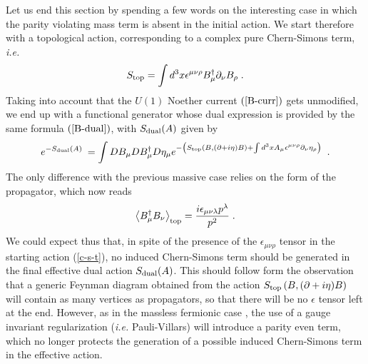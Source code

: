 \documentclass[a4paper,12pt]{article}
\begin{document}
\noindent Let us end this section by spending a few words on the interesting
case in which the parity violating mass term is absent in the initial
action. We start therefore with a topological action, corresponding to
a complex pure Chern-Simons term, {\it i.e.}
\begin{equation}
S_{{\rm top}}=\int d^3x\epsilon ^{\mu \nu \rho }B_\mu ^{\dagger
}\partial _\nu B_\rho \;.
\label{c-s-t}
\end{equation}
Taking into account that the $U(1)$ Noether current $\left( {\rm {\ref
      {B-curr}}}\right) $ gets unmodified, we end up with a functional
generator whose dual expression is provided by the same formula
$\left( {\rm {\ref {B-dual}}}\right) $, with $S_{{\rm dual}}(A)$ given
by
\begin{equation}
e^{-S_{{\rm dual}}(A)\;}=\int DB_\mu DB_\mu ^{\dagger }D\eta _\mu e^{-\left(
S_{{\rm top}}(B,(\partial +i\eta )B)+\int d^3xA_\mu \epsilon ^{\mu \nu
\rho }\partial _\nu \eta _\rho \right) \;}\;.  \label{d-c-s}
\end{equation}
The only difference with the previous massive case relies on the form
of the propagator, which now reads
\begin{equation}
\left\langle B_\mu ^{\dagger }B_\nu \right\rangle _{{\rm top}}=\frac{%
i\epsilon _{\mu \nu \lambda }p^\lambda }{p^2}\;.  \label{c-s-prop}
\end{equation}
We could expect thus that, in spite of the presence of the $\epsilon_{\mu \nu
  \rho }$ tensor in the starting action (\ref{c-s-t}), no induced
Chern-Simons term should be generated in the final effective dual action
$S_{{\rm dual}}(A)$. This should follow form the observation that  a
generic Feynman diagram obtained from the action $S_{\rm top }\left(
  B,(\partial +i\eta )B\right)$ will contain as many vertices as propagators, so
that there will be no $\epsilon$ tensor left at the end. However, as in the massless fermionic case {\cite{large}}, the use of a gauge invariant regularization ({\it i.e.} Pauli-Villars) will introduce a parity even term, which no longer protects the generation of a possible induced Chern-Simons term in the effective action. 
\end{document}
